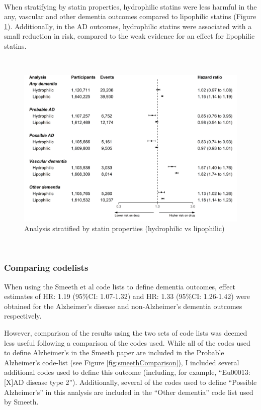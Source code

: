 \documentclass[a4paper, twoside]{templates/ociamthesis}
\begin{document}
~

When stratifying by statin properties, hydrophilic statins were less harmful in the any, vascular and other dementia outcomes compared to lipophilic statins (Figure \ref{fig:statinTypeFig}). Additionally, in the AD outcomes, hydrophilic statins were associated with a small reduction in risk, compared to the weak evidence for an effect for lipophilic statins.

~





\begin{figure}[H]
\includegraphics[width=1\linewidth]{figures/cprd-analysis/forester_sta_type} \caption[Analysis stratified by statin properties]{Analysis stratified by statin properties (hydrophilic vs lipophilic)}\label{fig:statinTypeFig}
\end{figure}

~

\hypertarget{comparing-codelists}{%
\subsubsection{Comparing codelists}\label{comparing-codelists}}

When using the Smeeth et al code lists to define dementia outcomes, effect estimates of HR: 1.19 (95\%CI: 1.07-1.32) and HR: 1.33 (95\%CI: 1.26-1.42) were obtained for the Alzheimer's disease and non-Alzheimer's dementia outcomes respectively.

However, comparison of the results using the two sets of code lists was deemed less useful following a comparison of the codes used. While all of the codes used to define Alzheimer's in the Smeeth paper are included in the Probable Alzheimer's code-list (see Figure \ref{fig:smeethComparison}), I included several additional codes used to define this outcome (including, for example, ``Eu00013: {[}X{]}AD disease type 2''). Additionally, several of the codes used to define ``Possible Alzheimer's'' in this analysis are included in the ``Other dementia'' code list used by Smeeth.
\end{document}
